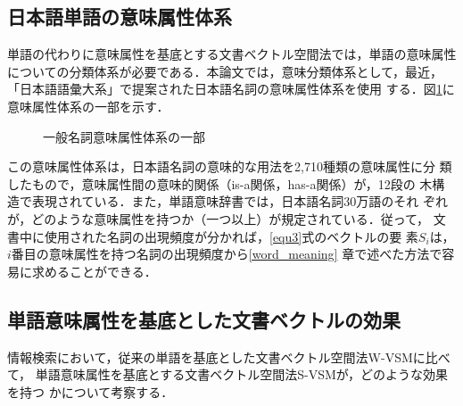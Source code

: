 \subsection{日本語単語の意味属性体系}
\label{goitaikei}

単語の代わりに意味属性を基底とする文書ベクトル空間法では，単語の意味属性
についての分類体系が必要である．本論文では，意味分類体系として，最近，
「日本語語彙大系」\cite{池原}で提案された日本語名詞の意味属性体系を使用
する．図\ref{imi}に意味属性体系の一部を示す．

\begin{figure}[h]
 \begin{center}
 
 \end{center}
 \caption{一般名詞意味属性体系の一部 }
 
 \label{imi}
\end{figure}


この意味属性体系は，日本語名詞の意味的な用法を2,710種類の意味属性に分
類したもので，意味属性間の意味的関係（is-a関係，has-a関係）が，12段の
木構造で表現されている．また，単語意味辞書では，日本語名詞30万語のそれ
ぞれが，どのような意味属性を持つか（一つ以上）が規定されている．従って，
文書中に使用された名詞の出現頻度が分かれば，\ref{equ3}式のベクトルの要
素$S_i$は，$i$番目の意味属性を持つ名詞の出現頻度から\ref{word_meaning}
章で述べた方法で容易に求めることができる．

\subsection{単語意味属性を基底とした文書ベクトルの効果}

情報検索において，従来の単語を基底とした文書ベクトル空間法W-VSMに比べて，
単語意味属性を基底とする文書ベクトル空間法S-VSMが，どのような効果を持つ
かについて考察する．


